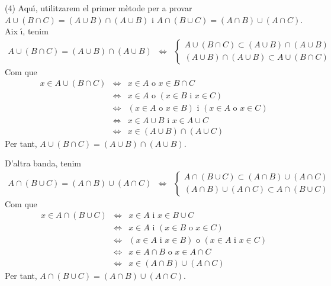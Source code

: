 \begin{solucio}
(4) Aqu\'{\i}, utilitzarem el primer m\`{e}tode per a provar $A\cup (B\cap
C)=(A\cup B)\cap (A\cup B)$ i $A\cap (B\cup C)=(A\cap B)\cup (A\cap C)$. Aix%
\'{\i}, tenim%
\begin{equation*}
\begin{array}{ccc}
A\cup (B\cap C)=(A\cup B)\cap (A\cup B) & \Longleftrightarrow & \left\{
\begin{array}{c}
A\cup (B\cap C)\subset (A\cup B)\cap (A\cup B) \\
(A\cup B)\cap (A\cup B)\subset A\cup (B\cap C)%
\end{array}%
\right.%
\end{array}%
\end{equation*}%
Com que%
\begin{equation*}
\begin{array}{lll}
x\in A\cup (B\cap C) & \Longleftrightarrow & x\in A\text{ o }x\in B\cap C \\
& \Longleftrightarrow & x\in A\text{ o }\left( x\in B\text{ i }x\in C\right)
\\
& \Longleftrightarrow & \left( x\in A\text{ o }x\in B\right) \text{ i }%
\left( x\in A\text{ o }x\in C\right) \\
& \Longleftrightarrow & x\in A\cup B\text{ i }x\in A\cup C \\
& \Longleftrightarrow & x\in (A\cup B)\cap (A\cup C)%
\end{array}%
\end{equation*}%
Per tant, $A\cup (B\cap C)=(A\cup B)\cap (A\cup B)$.

D'altra banda, tenim%
\begin{equation*}
\begin{array}{ccc}
A\cap (B\cup C)=(A\cap B)\cup (A\cap C) & \Longleftrightarrow & \left\{
\begin{array}{c}
A\cap (B\cup C)\subset (A\cap B)\cup (A\cap C) \\
(A\cap B)\cup (A\cap C)\subset A\cap (B\cup C)%
\end{array}%
\right.%
\end{array}%
\end{equation*}%
Com que%
\begin{equation*}
\begin{array}{lll}
x\in A\cap (B\cup C) & \Longleftrightarrow & x\in A\text{ i }x\in B\cup C \\
& \Longleftrightarrow & x\in A\text{ i }\left( x\in B\text{ o }x\in C\right)
\\
& \Longleftrightarrow & \left( x\in A\text{ i }x\in B\right) \text{ o }%
\left( x\in A\text{ i }x\in C\right) \\
& \Longleftrightarrow & x\in A\cap B\text{ o }x\in A\cap C \\
& \Longleftrightarrow & x\in (A\cap B)\cup (A\cap C)%
\end{array}%
\end{equation*}%
Per tant, $A\cap (B\cup C)=(A\cap B)\cup (A\cap C)$.


\end{solucio}
